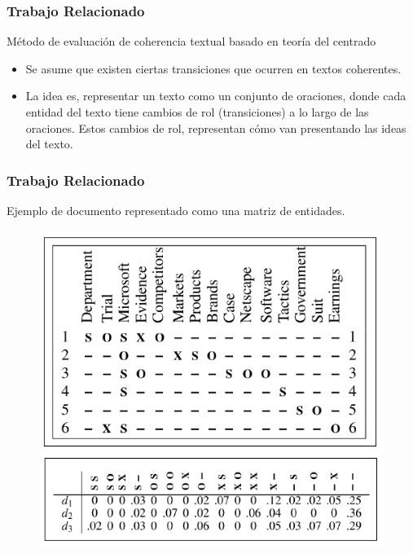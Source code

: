 \documentclass{beamer}
\begin{document}
\begin{frame}
\frametitle{Trabajo Relacionado}

Método de evaluación de coherencia textual basado en teoría del centrado

\begin{itemize}
\item Se asume que existen ciertas transiciones que ocurren en textos coherentes.
\item La idea es, representar un texto como un conjunto de oraciones, donde cada entidad del texto tiene cambios de rol (transiciones) a lo largo de las oraciones. Estos cambios de rol, representan cómo van presentando las ideas del texto.
\end{itemize}

\end{frame}


\begin{frame}
\frametitle{Trabajo Relacionado}
Ejemplo de documento representado como una matriz de entidades.
\begin{figure}
\includegraphics[width=0.5\linewidth]{fig4.png}
\end{figure}

\end{frame}

\end{document}
